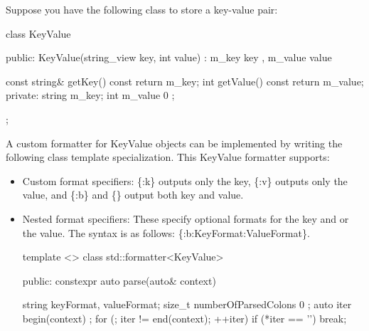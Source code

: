 Suppose you have the following class to store a key-value pair:

\begin{cpp}
class KeyValue
{
    public:
        KeyValue(string_view key, int value) : m_key { key }, m_value { value } {}

        const string& getKey() const { return m_key; }
        int getValue() const { return m_value; }
    private:
        string m_key;
        int m_value { 0 };
};
\end{cpp}

A custom formatter for KeyValue objects can be implemented by writing the following class template specialization. This KeyValue formatter supports:

\begin{itemize}
\item
Custom format specifiers: \{:k\} outputs only the key, \{:v\} outputs only the value, and \{:b\} and \{\} output both key and value.

\item
Nested format specifiers: These specify optional formats for the key and or the value. The syntax is as follows: \{:b:KeyFormat:ValueFormat\}.

\begin{cpp}
template <>
class std::formatter<KeyValue>
{
    public:
        constexpr auto parse(auto& context)
        {
            string keyFormat, valueFormat;
            size_t numberOfParsedColons { 0 };
            auto iter { begin(context) };
            for (; iter != end(context); ++iter) {
                if (*iter == '}') { break; }

}}
\end{cpp}
\end{itemize}
